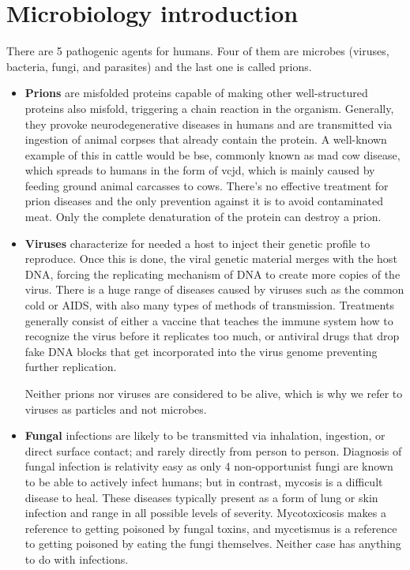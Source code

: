 \section{Microbiology introduction}

There are 5 pathogenic agents for humans. Four of them are microbes (viruses, bacteria, fungi, and parasites) and the last one is called prions.

\begin{itemize}

\item 
\textbf{Prions} are misfolded proteins capable of making other well-structured proteins also misfold, triggering a chain reaction in the organism. Generally, they provoke neurodegenerative diseases in humans and are transmitted via ingestion of animal corpses that already contain the protein. A well-known example of this in cattle would be \gls{bse}, commonly known as mad cow disease, which spreads to humans in the form of \gls{vcjd}, which is mainly caused by feeding ground animal carcasses to cows. There's no effective treatment for prion diseases and the only prevention against it is to avoid contaminated meat. Only the complete denaturation of the protein can destroy a prion.

\item 
\textbf{Viruses} characterize for needed a host to inject their genetic profile to reproduce. Once this is done, the viral genetic material merges with the host DNA, forcing the replicating mechanism of DNA to create more copies of the virus. There is a huge range of diseases caused by viruses such as the common cold or AIDS, with also many types of methods of transmission. Treatments generally consist of either a vaccine that teaches the immune system how to recognize the virus before it replicates too much, or antiviral drugs that drop fake DNA blocks that get incorporated into the virus genome preventing further replication.

Neither prions nor viruses are considered to be alive, which is why we refer to viruses as particles and not microbes.

\item 
\textbf{Fungal} infections are likely to be transmitted via inhalation, ingestion, or direct surface contact; and rarely directly from person to person. Diagnosis of fungal infection is relativity easy as only 4 non-opportunist fungi are known to be able to actively infect humans; but in contrast, mycosis is a difficult disease to heal. These diseases typically present as a form of lung or skin infection and range in all possible levels of severity. Mycotoxicosis makes a reference to getting poisoned by fungal toxins, and mycetismus is a reference to getting poisoned by eating the fungi themselves. Neither case has anything to do with infections.



\end{itemize}
